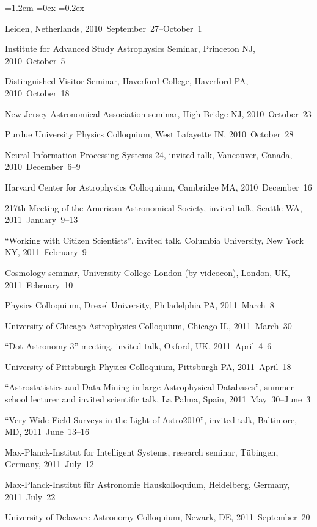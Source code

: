 \documentclass[10pt,letterpaper]{article}
\newcounter{refpubnum}
\newcommand{\hogglist}{%
    \rightmargin=0in
    \leftmargin=1.2em
    \topsep=0ex
    \partopsep=0pt
    \itemsep=0.2ex
    \parsep=0pt
    \itemindent=-1.0\leftmargin
    \listparindent=0.0\leftmargin
    \settowidth{\labelsep}{~}
    \usecounter{refpubnum}
  }
\begin{document}
\begin{list}{}{\hogglist}
{          Leiden, Netherlands, 2010~September~27--October~1
\item Institute for Advanced Study Astrophysics Seminar,
          Princeton NJ, 2010~October~5
\item Distinguished Visitor Seminar, Haverford College,
          Haverford PA, 2010~October~18
\item New Jersey Astronomical Association seminar,
          High Bridge NJ, 2010~October~23
\item Purdue University Physics Colloquium,
          West Lafayette IN, 2010~October~28
\item Neural Information Processing Systems 24, invited talk,
          Vancouver, Canada, 2010~December~6--9
\item Harvard Center for Astrophysics Colloquium,
          Cambridge MA, 2010~December~16
\item 217th Meeting of the American Astronomical Society, invited talk,
          Seattle WA, 2011~January~9--13
\item ``Working with Citizen Scientists'', invited talk,
          Columbia University, New York NY, 2011~February~9
\item Cosmology seminar, University College London (by videocon),
          London, UK, 2011~February~10
\item Physics Colloquium, Drexel University,
          Philadelphia PA, 2011~March~8
\item University of Chicago Astrophysics Colloquium, Chicago IL, 2011~March~30
\item ``Dot Astronomy 3'' meeting, invited talk, Oxford, UK, 2011~April~4--6
\item University of Pittsburgh Physics Colloquium, Pittsburgh PA, 2011~April~18
\item ``Astrostatistics and Data Mining in large Astrophysical Databases'', summer-school lecturer and invited scientific talk,
          La Palma, Spain, 2011~May~30--June~3
\item ``Very Wide-Field Surveys in the Light of Astro2010'', invited talk,
          Baltimore, MD, 2011~June~13--16
\item Max-Planck-Institut for Intelligent Systems, research seminar,
          T\"ubingen, Germany, 2011~July~12
\item Max-Planck-Institut f\"ur Astronomie Hauskolloquium,
          Heidelberg, Germany, 2011~July~22
\item University of Delaware Astronomy Colloquium,
          Newark, DE, 2011~September~20
}
\end{list}
\end{document}
